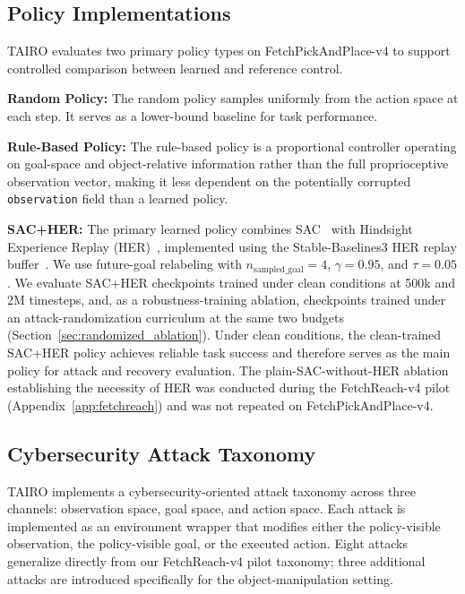 \documentclass[conference]{IEEEtran}
\begin{document}
\subsection{Policy Implementations}

TAIRO evaluates two primary policy types on FetchPickAndPlace-v4 to support controlled
comparison between learned and reference control.

\textbf{Random Policy:} The random policy samples uniformly from the action space at
each step. It serves as a lower-bound baseline for task performance.

\textbf{Rule-Based Policy:} The rule-based policy is a proportional controller operating
on goal-space and object-relative information rather than the full proprioceptive
observation vector, making it less dependent on the potentially corrupted
\texttt{observation} field than a learned policy.

\textbf{SAC+HER:} The primary learned policy combines SAC~\cite{haarnoja2018soft} with
Hindsight Experience Replay (HER)~\cite{andrychowicz2017hindsight}, implemented using
the Stable-Baselines3 HER replay buffer~\cite{sb3}. We use future-goal relabeling with
$n_{\mathrm{sampled\_goal}}=4$, $\gamma=0.95$, and $\tau=0.05$. We evaluate SAC+HER
checkpoints trained under clean conditions at 500k and 2M timesteps, and, as a
robustness-training ablation, checkpoints trained under an attack-randomization curriculum
at the same two budgets (Section~\ref{sec:randomized_ablation}). Under clean conditions,
the clean-trained SAC+HER policy achieves reliable task success and therefore serves as
the main policy for attack and recovery evaluation. The plain-SAC-without-HER ablation
establishing the necessity of HER was conducted during the FetchReach-v4 pilot
(Appendix~\ref{app:fetchreach}) and was not repeated on FetchPickAndPlace-v4.

\subsection{Cybersecurity Attack Taxonomy}
\label{sec:attacks}

TAIRO implements a cybersecurity-oriented attack taxonomy across three channels:
observation space, goal space, and action space. Each attack is implemented as an
environment wrapper that modifies either the policy-visible observation, the
policy-visible goal, or the executed action. Eight attacks generalize directly from
our FetchReach-v4 pilot taxonomy; three additional attacks are introduced specifically
for the object-manipulation setting.
\end{document}
